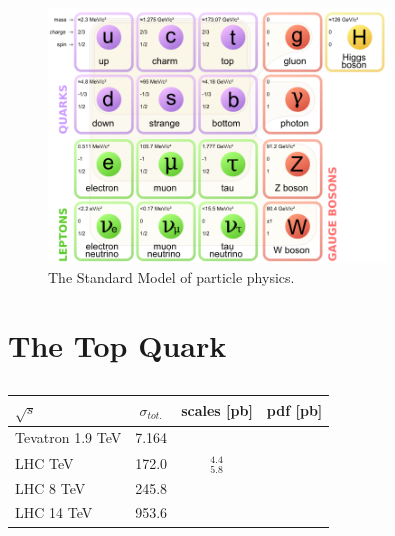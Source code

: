 \begin{figure}
\begin{center}
\includegraphics[width=0.8\textwidth]{Figures/StandardModel.png}
\caption{The Standard Model of particle physics.}
\end{center}
\end{figure}

\section{The Top Quark} \label{sec-TheTopQuark}

\begin{table} \label{tab:mumu_cutflow}
\begin{center}
\begin{tabular}{lccc}
\hline
\hline
\textbf{$\sqrt{s}$} & \textbf{$\sigma_{tot.}$} & \textbf{scales [pb]} & \textbf{pdf [pb]} \\
\hline
Tevatron 1.9 TeV & 7.164 & & \\
LHC TeV & 172.0 & $^4.4_5.8$ &  \\ 
LHC 8 TeV & 245.8 & & \\
LHC 14 TeV & 953.6 & & \\
\hline
\hline
\end{tabular}
\caption{\cite{Czakon:2013goa}}
\end{center}
\end{table}

